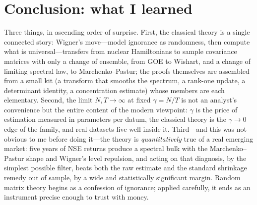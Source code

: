 \documentclass[11pt]{article}
\begin{document}
\section{Conclusion: what I learned}
\label{sec:conclusion}

Three things, in ascending order of surprise. First, the classical theory
is a single connected story: Wigner's move---model ignorance as
randomness, then compute what is universal---transfers from nuclear
Hamiltonians to sample covariance matrices with only a change of ensemble,
from GOE to Wishart, and a change of limiting spectral law, to
Marchenko--Pastur; the proofs themselves are assembled from a small kit
(a transform that smooths the spectrum, a rank-one update, a determinant
identity, a concentration estimate) whose members are each elementary.
Second, the limit $N,T\to\infty$ at fixed $\gamma=N/T$ is not an analyst's
convenience but the entire content of the modern viewpoint: $\gamma$ is
the price of estimation measured in parameters per datum, the classical
theory is the $\gamma\to0$ edge of the family, and real datasets live well
inside it. Third---and this was not obvious to me before doing it---the
theory is \emph{quantitatively} true of a real emerging market: five years
of NSE returns produce a spectral bulk with the Marchenko--Pastur shape
and Wigner's level repulsion, and acting on that diagnosis, by the
simplest possible filter, beats both the raw estimate and the standard
shrinkage remedy out of sample, by a wide and statistically significant
margin. Random matrix theory begins as a confession of ignorance; applied
carefully, it ends as an instrument precise enough to trust with money.
\end{document}

